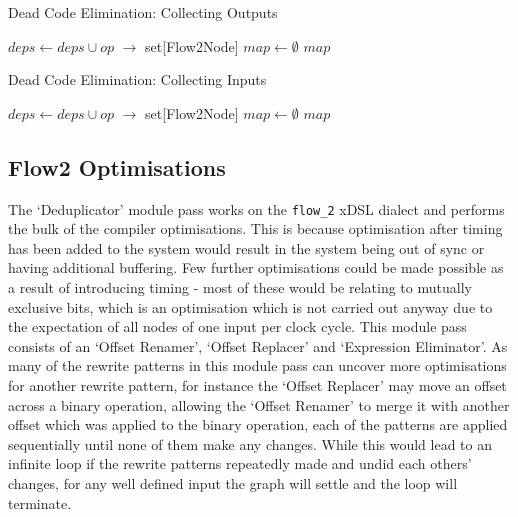 \renewcommand\theFancyVerbLine{\arabic{FancyVerbLine}}
\begin{algorithm}[H]
\caption{Dead Code Elimination: Collecting Outputs}\label{algo.dce.out}
\begin{algorithmic}[1]
\State $deps \gets deps \cup op$
\State {}
\EndFor
\EndIf
\EndFunction
{} $ \rightarrow $ set[Flow2Node]
\State $map \gets \emptyset$
\State {}
\EndIf
\EndFor
\Return $map$
\EndFunction
\end{algorithmic}
\end{algorithm}

\renewcommand\theFancyVerbLine{\arabic{FancyVerbLine}}
\begin{algorithm}[H]
\caption{Dead Code Elimination: Collecting Inputs}\label{algo.dce.in}
\begin{algorithmic}[1]
\State $deps \gets deps \cup op$
\State {}
\EndFor
\EndIf
\EndFunction
{} $ \rightarrow $ set[Flow2Node]
\State $map \gets \emptyset$
\State {}
\EndIf
\EndFor
\Return $map$
\EndFunction
\end{algorithmic}
\end{algorithm}

\subsection{Flow2 Optimisations}
The `Deduplicator' module pass works on the \lstinline|flow_2| xDSL dialect and performs the bulk of the compiler optimisations. This is because optimisation after timing has been added to the system would result in the system being out of sync or having additional buffering. Few further optimisations could be made possible as a result of introducing timing \hyphen{} most of these would be relating to mutually exclusive bits, which is an optimisation which is not carried out anyway due to the expectation of all nodes of one input per clock cycle. This module pass consists of an `Offset Renamer', `Offset Replacer' and `Expression Eliminator'. As many of the rewrite patterns in this module pass can uncover more optimisations for another rewrite pattern, for instance the `Offset Replacer' may move an offset across a binary operation, allowing the `Offset Renamer' to merge it with another offset which was applied to the binary operation, each of the patterns are applied sequentially until none of them make any changes. While this would lead to an infinite loop if the rewrite patterns repeatedly made and undid each others' changes, for any well defined input the graph will settle and the loop will terminate.

